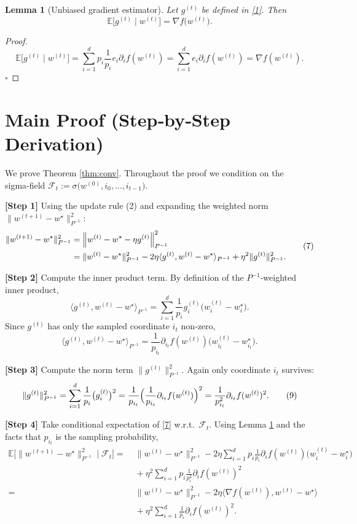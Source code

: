 \documentclass{article}
\newtheorem{lemma}{Lemma}
\newcommand{\E}{\mathbb{E}}
\newcommand{\ip}[2]{\langle #1,#2\rangle}
\begin{document}
\begin{lemma}[Unbiased gradient estimator]\label{lem:unbiased}
Let $g^{(t)}$ be defined in \eqref{1}. Then
\[
\E\!\bigl[g^{(t)}\mid w^{(t)}\bigr]=\nabla f\!\bigl(w^{(t)}\bigr).
\]
\end{lemma}
\begin{proof}
\[
\E\!\bigl[g^{(t)}\mid w^{(t)}\bigr]
=\sum_{i=1}^{d}p_i\frac{1}{p_i}e_i\partial_i f(w^{(t)})
=\sum_{i=1}^{d}e_i\partial_i f(w^{(t)})=\nabla f(w^{(t)}).
\] \hfill $\square$
\end{proof}

\section*{Main Proof (Step‑by‑Step Derivation)}
We prove Theorem \ref{thm:conv}. Throughout the proof we condition on the sigma‑field
$\mathcal{F}_t:=\sigma\!\bigl(w^{(0)},i_0,\dots,i_{t-1}\bigr)$.

\bigskip
\noindent\textbf{[Step 1]}  Using the update rule (2) and expanding the weighted norm
$\|w^{(t+1)}-w^{\star}\|_{P^{-1}}^{2}$:
\[
\begin{aligned}
\|w^{(t+1)}-w^{\star}\|_{P^{-1}}^{2}
&= \Bigl\|w^{(t)}-w^{\star}-\eta g^{(t)}\Bigr\|_{P^{-1}}^{2}\\
&= \|w^{(t)}-w^{\star}\|_{P^{-1}}^{2}
   -2\eta\ip{g^{(t)}}{w^{(t)}-w^{\star}}_{P^{-1}}
   +\eta^{2}\|g^{(t)}\|_{P^{-1}}^{2}.
\end{aligned}
\tag{7}
\]

\noindent\textbf{[Step 2]}  Compute the inner product term. By definition of the
$P^{-1}$‑weighted inner product,
\[
\ip{g^{(t)}}{w^{(t)}-w^{\star}}_{P^{-1}}
= \sum_{i=1}^{d}\frac{1}{p_i}g^{(t)}_i\bigl(w^{(t)}_i-w^{\star}_i\bigr).
\]
Since $g^{(t)}$ has only the sampled coordinate $i_t$ non‑zero,
\[
\ip{g^{(t)}}{w^{(t)}-w^{\star}}_{P^{-1}}
= \frac{1}{p_{i_t}}\partial_{i_t}f(w^{(t)})\bigl(w^{(t)}_{i_t}-w^{\star}_{i_t}\bigr).
\tag{8}
\]

\noindent\textbf{[Step 3]}  Compute the norm term $\|g^{(t)}\|_{P^{-1}}^{2}$.
Again only coordinate $i_t$ survives:
\[
\|g^{(t)}\|_{P^{-1}}^{2}
= \sum_{i=1}^{d}\frac{1}{p_i}\bigl(g^{(t)}_i\bigr)^{2}
= \frac{1}{p_{i_t}}\Bigl(\frac{1}{p_{i_t}}\partial_{i_t}f(w^{(t)})\Bigr)^{2}
= \frac{1}{p_{i_t}^{2}}\partial_{i_t}f(w^{(t)})^{2}.
\tag{9}
\]

\noindent\textbf{[Step 4]}  Take conditional expectation of \eqref{7} w.r.t.\ $\mathcal{F}_t$.
Using Lemma \ref{lem:unbiased} and the facts that $p_{i_t}$ is the sampling
probability,
\[
\begin{aligned}
\E\!\bigl[\|w^{(t+1)}-w^{\star}\|_{P^{-1}}^{2}\mid\mathcal{F}_t\bigr]
=&\; \|w^{(t)}-w^{\star}\|_{P^{-1}}^{2}
   -2\eta\sum_{i=1}^{d}p_i\frac{1}{p_i}\partial_i f(w^{(t)})\bigl(w^{(t)}_i-w^{\star}_i\bigr)\\
   &\;+\eta^{2}\sum_{i=1}^{d}p_i\frac{1}{p_i^{2}}\partial_i f(w^{(t)})^{2}\\
=&\; \|w^{(t)}-w^{\star}\|_{P^{-1}}^{2}
   -2\eta\ip{\nabla f(w^{(t)})}{w^{(t)}-w^{\star}}\\
   &\;+\eta^{2}\sum_{i=1}^{d}\frac{1}{p_i}\partial_i f(w^{(t)})^{2}.
\end{aligned}
\tag{10}
\]
\end{document}
